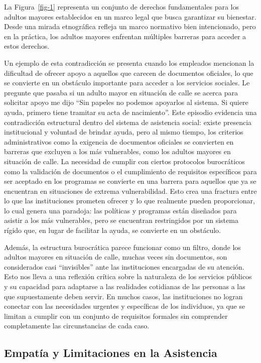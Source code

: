 \documentclass[
  spanish,
  11pt,
  a4paper,
]{scrbook}
\begin{document}
La Figura~\ref{fig-1} representa un conjunto de derechos fundamentales
para los adultos mayores establecidos en un marco legal que busca
garantizar su bienestar. Desde una mirada etnográfica refleja un marco
normativo bien intencionado, pero en la práctica, los adultos mayores
enfrentan múltiples barreras para acceder a estos derechos.

Un ejemplo de esta contradicción se presenta cuando los empleados
mencionan la dificultad de ofrecer apoyo a aquellos que carecen de
documentos oficiales, lo que se convierte en un obstáculo importante
para acceder a los servicios sociales. Le pregunte que pasaba si un
adulto mayor en situación de calle se acerca para solicitar apoyo me
dijo ``Sin papeles no podemos apoyarlos al sistema. Si quiere ayuda,
primero tiene tramitar su acta de nacimiento''. Este episodio evidencia
una contradicción estructural dentro del sistema de asistencia social:
existe presencia institucional y voluntad de brindar ayuda, pero al
mismo tiempo, los criterios administrativos como la exigencia de
documentos oficiales se convierten en barreras que excluyen a los más
vulnerables, como los adultos mayores en situación de calle. La
necesidad de cumplir con ciertos protocolos burocráticos como la
validación de documentos o el cumplimiento de requisitos específicos
para ser aceptado en los programas se convierte en una barrera para
aquellos que ya se encuentran en situaciones de extrema vulnerabilidad.
Esto crea una fractura entre lo que las instituciones prometen ofrecer y
lo que realmente pueden proporcionar, lo cual genera una paradoja: las
políticas y programas están diseñados para asistir a los más
vulnerables, pero se encuentran restringidos por un sistema rígido que,
en lugar de facilitar la ayuda, se convierte en un obstáculo.

Además, la estructura burocrática parece funcionar como un filtro, donde
los adultos mayores en situación de calle, muchas veces sin documentos,
son considerados casi ``invisibles'' ante las instituciones encargadas
de su atención. Esto nos lleva a una reflexión crítica sobre la
naturaleza de los servicios públicos y su capacidad para adaptarse a las
realidades cotidianas de las personas a las que supuestamente deben
servir. En muchos casos, las instituciones no logran conectar con las
necesidades urgentes y específicas de los individuos, ya que se limitan
a cumplir con un conjunto de requisitos formales sin comprender
completamente las circunstancias de cada caso.

\subsection*{Empatía y Limitaciones en la
Asistencia}\label{empatuxeda-y-limitaciones-en-la-asistencia}
\end{document}
